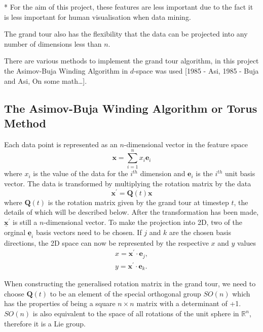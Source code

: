 \documentclass[a4paper,11pt,twoside]{article}
\begin{document}
* For the aim of this project, these features are less important due to the fact it is less important for human visualisation when data mining.
\newline

The grand tour also has the flexibility that the data can be projected into any number of dimensions less than $n$.
\newline

There are various methods to implement the grand tour algorithm, in this project the Asimov-Buja Winding Algorithm in $d$-space was used [1985 - Asi, 1985 - Buja and Asi, On some math…]. 

\subsection{The Asimov-Buja Winding Algorithm or Torus Method}

Each data point is represented as an $n$-dimensional vector in the feature space
\begin{equation}
\bm{x}=\sum_{i=1}^n x_i \bm{e}_i 
\end{equation}
where $x_i$ is the value of the data for the $i^{th}$ dimension and $\bm{e}_i$ is the $i^{th}$ unit basis vector. The data is transformed by multiplying the rotation matrix by the data
\begin{equation}
\bm{x}^\prime = \bm{Q}(t) \bm{x}
\end{equation}
where $\bm{Q}(t)$ is the rotation matrix given by the grand tour at timestep $t$, the details of which will be described below. After the transformation has been made, $\bm{\underline{x}}^\prime$ is still a $n$-dimensional vector. To make the projection into 2D, two of the orginal $\bm{\underline{e}}_i$ basis vectors need to be chosen. If $j$ and $k$ are the chosen basis directions, the 2D space can now be represented by the respective $x$ and $y$ values
\begin{equation}
\begin{split}
x=\bm{x}^\prime\cdot\bm{e}_j, 
\\
y=\bm{x}^\prime\cdot\bm{e}_k.
\end{split}
\end{equation}

When constructing the generalised rotation matrix in the grand tour, we need to choose $\bm{Q}(t)$ to be an element of the special orthogonal group $SO(n)$ which has the properties of being a square $n\times n$ matrix with a determinant of +1. $SO(n)$ is also equivalent to the space of all rotations of the unit sphere in $\mathbb{R}^n$, therefore it is a Lie group.
\newline
\end{document}
